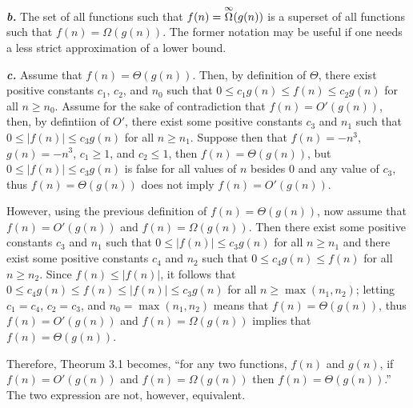 \noindent\textbf{\textit{b.}} The set of all functions such that $f(n) = \overset{\small\infty}{\Omega}(g(n))$ is a superset of all functions such that $f(n) = \Omega(g(n))$. The former notation may be useful if one needs a less strict approximation of a lower bound.

\noindent\textbf{\textit{c.}} Assume that $f(n) = \Theta(g(n))$. Then, by definition of $\Theta$, there exist positive constants $c_1$, $c_2$, and $n_0$ such that $0 \leq c_1 g(n) \leq f(n) \leq c_2 g(n)$ for all $n \geq n_0$. Assume for the sake of contradiction that $f(n) = O'(g(n))$, then, by defintiion of $O'$, there exist some positive constants $c_3$ and $n_1$ such that $0 \leq | f(n) | \leq c_3 g(n)$ for all $n \geq n_1$. Suppose then that $f(n) = -n^3$, $g(n) = -n^3$, $c_1 \geq 1$, and $c_2 \leq 1$, then $f(n) = \Theta(g(n))$, but $0 \leq | f(n) | \leq c_3 g(n)$ is false for all values of $n$ besides $0$ and any value of $c_3$, thus $f(n) = \Theta(g(n))$ does not imply $f(n) = O'(g(n))$.

However, using the previous definition of $f(n) = \Theta(g(n))$, now assume that $f(n) = O'(g(n))$ and $f(n) = \Omega(g(n))$. Then there exist some positive constants $c_3$ and $n_1$ such that $0 \leq | f(n) | \leq c_3 g(n)$ for all $n \geq n_1$ and there exist some positive constants $c_4$ and $n_2$ such that $0 \leq c_4 g(n) \leq f(n)$ for all $n \geq n_2$. Since $f(n) \leq | f(n) |$, it follows that $0 \leq c_4 g(n) \leq f(n) \leq | f(n) | \leq c_3 g(n)$ for all $n \geq \max(n_1, n_2)$; letting $c_1 = c_4$, $c_2 = c_3$, and $n_0 = \max(n_1, n_2)$ means that $f(n) = \Theta(g(n))$, thus $f(n) = O'(g(n))$ and $f(n) = \Omega(g(n))$ implies that $f(n) = \Theta(g(n))$.

Therefore, Theorum 3.1 becomes, ``for any two functions, $f(n)$ and $g(n)$, if $f(n) = O'(g(n))$ and $f(n) = \Omega(g(n))$ then $f(n) = \Theta(g(n))$.'' The two expression are not, however, equivalent.

